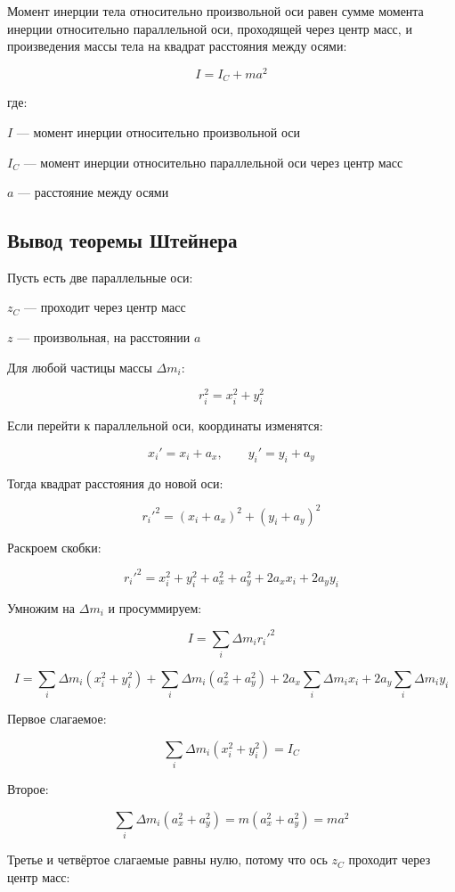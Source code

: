 \documentclass[a4paper,12pt]{article}
\begin{document}
\begin{theorembox}
Момент инерции тела относительно произвольной оси равен сумме момента инерции относительно параллельной оси, проходящей через центр масс, и произведения массы тела на квадрат расстояния между осями:
\end{theorembox}

\[
I = I_C + ma^2
\]

где:

$I$ — момент инерции относительно произвольной оси

$I_C$ — момент инерции относительно параллельной оси через центр масс

$a$ — расстояние между осями

\vspace{0.8em}

\subsection*{Вывод теоремы Штейнера}

Пусть есть две параллельные оси:

$z_C$ — проходит через центр масс

$z$ — произвольная, на расстоянии $a$

Для любой частицы массы $\Delta m_i$:

\[
r_i^2 = x_i^2 + y_i^2
\]

Если перейти к параллельной оси, координаты изменятся:

\[
x_i' = x_i + a_x,\qquad y_i' = y_i + a_y
\]

Тогда квадрат расстояния до новой оси:

\[
r_i'^2 = (x_i + a_x)^2 + (y_i + a_y)^2
\]

Раскроем скобки:

\[
r_i'^2
=
x_i^2 + y_i^2 + a_x^2 + a_y^2 + 2a_xx_i + 2a_yy_i
\]

Умножим на $\Delta m_i$ и просуммируем:

\[
I = \sum_i \Delta m_i r_i'^2
\]

\[
I
=
\sum_i \Delta m_i (x_i^2 + y_i^2)
+
\sum_i \Delta m_i (a_x^2 + a_y^2)
+
2a_x \sum_i \Delta m_i x_i
+
2a_y \sum_i \Delta m_i y_i
\]

Первое слагаемое:

\[
\sum_i \Delta m_i (x_i^2 + y_i^2) = I_C
\]

Второе:

\[
\sum_i \Delta m_i (a_x^2 + a_y^2)
=
m(a_x^2 + a_y^2)
=
ma^2
\]

Третье и четвёртое слагаемые равны нулю, потому что ось $z_C$ проходит через центр масс:
\end{document}
